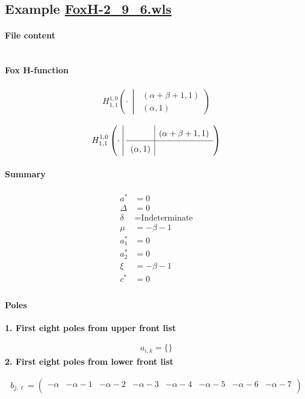 \documentclass[preview]{standalone}
\newcommand{\FoxH}[5]{H_{#2}^{#1}\left(#3\:\middle\vert\: \begin{array}{l}#4\\[0.4em] #5\end{array}\right)}
\begin{document}
\subsection{Example \url{FoxH-2_9_6.wls}}

\paragraph{File content}

\inputminted{text}{../Examples/FoxH-2_9_6.wls}

\paragraph{Fox H-function}

\begin{align*}
  \FoxH
    {1,0}
    {1,1}
    {\cdot}
    {\left(\alpha +\beta +1, 1\right)}
    {\left(\alpha, 1\right)}
\end{align*}

\begin{align*}
  \FoxHext
    {1,0}
    {1,1}
    {\cdot}
    {}
    {\left(\alpha +\beta +1, 1\right)}
    {\left(\alpha, 1\right)}
    {}
\end{align*}

\paragraph{Summary}

\begin{align*}
  a^*    & = 0 \\
  \Delta & = 0 \\
  \delta & = \text{Indeterminate} \\
  \mu    & = -\beta -1 \\
  a_1^*  & = 0 \\
  a_2^*  & = 0 \\
  \xi    & = -\beta -1 \\
  c^*    & = 0 \\
\end{align*}

\paragraph{Poles}

\noindent\textbf{1. First eight poles from upper front list}

\begin{align*}
  a_{i,k} = 
  \{\}
\end{align*}
\noindent\textbf{2. First eight poles from lower front list}

\begin{align*}
  b_{j,\ell} = 
  \left(
\begin{array}{cccccccc}
 -\alpha  & -\alpha -1 & -\alpha -2 & -\alpha -3 & -\alpha -4 & -\alpha -5 & -\alpha -6 & -\alpha -7 \\
\end{array}
\right)
\end{align*}
\end{document}
